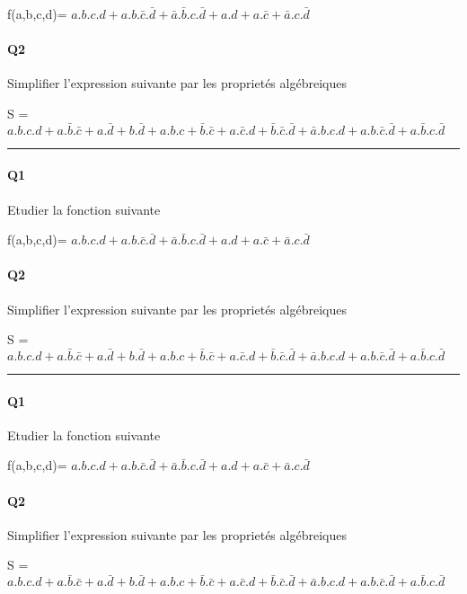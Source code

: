 f(a,b,c,d)= $ a.b.c.d + a.b.\bar c.\bar d + \bar a.\bar b.c.\bar d  +  a.d + a.\bar c + \bar a.c.\bar d $

\paragraph{Q2}

Simplifier l'expression suivante par les proprietés algébreiques 

S = $ a.b.c.d + a.\bar b.\bar c  +  a.\bar d + b.\bar d + a.b.c + \bar b.\bar c  +  a.\bar c.d + \bar b.\bar c.\bar d  +  \bar a.b.c.d + a.b.\bar c.\bar d + a.\bar b.c.\bar d $

\hrule width 1\linewidth
\paragraph{Q1}

Etudier la fonction suivante

f(a,b,c,d)= $ a.b.c.d + a.b.\bar c.\bar d + \bar a.\bar b.c.\bar d  +  a.d + a.\bar c + \bar a.c.\bar d $

\paragraph{Q2}

Simplifier l'expression suivante par les proprietés algébreiques 

S = $ a.b.c.d + a.\bar b.\bar c  +  a.\bar d + b.\bar d + a.b.c + \bar b.\bar c  +  a.\bar c.d + \bar b.\bar c.\bar d  +  \bar a.b.c.d + a.b.\bar c.\bar d + a.\bar b.c.\bar d $

\hrule width 1\linewidth
\paragraph{Q1}

Etudier la fonction suivante

f(a,b,c,d)= $ a.b.c.d + a.b.\bar c.\bar d + \bar a.\bar b.c.\bar d  +  a.d + a.\bar c + \bar a.c.\bar d $

\paragraph{Q2}

Simplifier l'expression suivante par les proprietés algébreiques 

S = $ a.b.c.d + a.\bar b.\bar c  +  a.\bar d + b.\bar d + a.b.c + \bar b.\bar c  +  a.\bar c.d + \bar b.\bar c.\bar d  +  \bar a.b.c.d + a.b.\bar c.\bar d + a.\bar b.c.\bar d $

